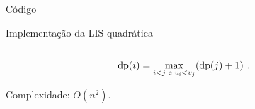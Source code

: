 \begin{frame}{Código}

    \begin{block}{Implementação da LIS quadrática}
        \footnotesize
        \inputminted{cpp}{codigos/lis.cpp}    
    \end{block}

    \[ \operatorname{dp}(i) = \max_{i < j \text{ e } v_i < v_j}(\operatorname{dp}(j)+1) \ . \]

    Complexidade: $O(n^2)$.
\end{frame}
